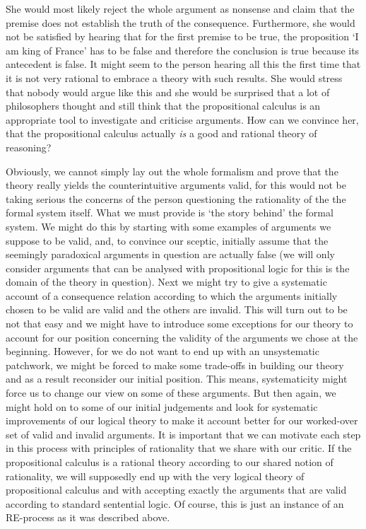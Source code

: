 \documentclass{article}
\begin{document}
She would most likely reject the whole argument as nonsense and claim that the premise does not establish the truth of the consequence. Furthermore, she would not be satisfied by hearing that for the first premise to be true, the proposition `I am king of France' has to be false and therefore the conclusion is true because its antecedent is false. It might seem to the person hearing all this the first time that it is not very rational to embrace a theory with such results. She would stress that nobody would argue like this and she would be surprised that a lot of philosophers thought and still think that the propositional calculus is an appropriate tool to investigate and criticise arguments. How can we convince her, that the propositional calculus actually \textit{is} a good and rational theory of reasoning?

Obviously, we cannot simply lay out the whole formalism and prove that the theory really yields the counterintuitive arguments valid, for this would not be taking serious the concerns of the person questioning the rationality of the the formal system itself. What we must provide is `the story behind' the formal system. We might do this by starting with some examples of arguments we suppose to be valid, and, to convince our sceptic, initially assume that the seemingly paradoxical arguments in question are actually false (we will only consider arguments that can be analysed with propositional logic for this is the domain of the theory in question). Next we might try to give a systematic account of a consequence relation according to which the arguments initially chosen to be valid are valid and the others are invalid. This will turn out to be not that easy and we might have to introduce some exceptions for our theory to account for our position concerning the validity of the arguments we chose at the beginning. However, for we do not want to end up with an unsystematic patchwork, we might be forced to make some trade-offs in building our theory and as a result reconsider our initial position. This means, systematicity might force us to change our view on some of these arguments. But then again, we might hold on to some of our initial judgements and look for systematic improvements of our logical theory to make it account better for our worked-over set of valid and invalid arguments. It is important that we can motivate each step in this process with principles of rationality that we share with our critic. If the propositional calculus is a rational theory according to our shared notion of rationality, we will supposedly end up with the very logical theory of propositional calculus and with accepting exactly the arguments that are valid according to standard sentential logic. Of course, this is just an instance of an RE-process as it was described above. 
\end{document}
